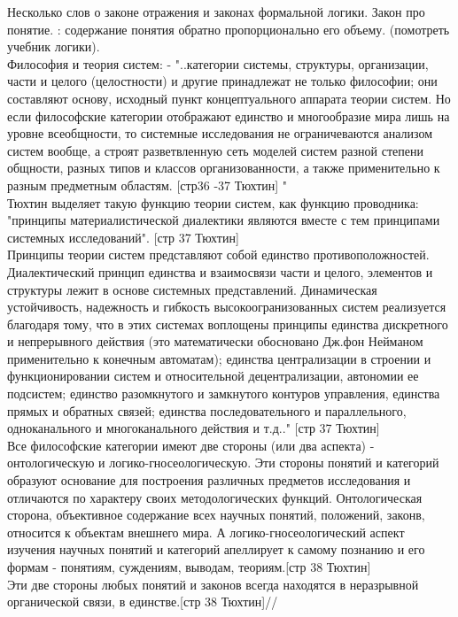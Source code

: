 \documentclass[a4paper,12pt]{report}
\begin{document}
Несколько слов о законе отражения и законах формальной логики.
Закон про понятие. : содержание понятия обратно пропорционально его объему. (помотреть учебник логики).
\\Философия и теория систем: - "..категории системы, структуры, организации, части и целого (целостности) и другие принадлежат не только философии; они составляют основу, исходный пункт концептуального аппарата теории систем. Но если философские категории отображают единство и многообразие мира лишь на уровне всеобщности, то системные исследования не ограничеваются анализом систем вообще, а строят разветвленную сеть моделей систем разной степени общности, разных типов и классов организованности, а также применительно к разным предметным областям. [стр36 -37 Тюхтин] "\\
Тюхтин выделяет такую функцию теории систем, как функцию проводника: "принципы материалистической диалектики являются вместе с тем принципами системных исследований". [стр 37 Тюхтин]\\
Принципы теории систем представляют собой единство противоположностей. Диалектический принцип единства и взаимосвязи части и целого, элементов и структуры лежит в основе системных представлений. Динамическая устойчивость, надежность и гибкость высокоогранизованных систем реализуется благодаря тому, что в этих системах воплощены принципы единства дискретного и непрерывного действия (это математически обосновано Дж.фон Нейманом применительно к конечным автоматам); единства централизации в строении и функционировании систем и относительной децентрализации, автономии ее подсистем; единство разомкнутого и замкнутого контуров управления, единства прямых и обратных связей; единства последовательного и параллельного, одноканального и многоканального действия и т.д.." [стр 37 Тюхтин]\\
Все философские категории имеют две стороны (или два аспекта) - онтологическую и логико-гносеологическую. Эти стороны понятий и категорий образуют основание для построения различных предметов исследования и отличаются по характеру своих методологических функций. Онтологическая сторона, объективное содержание всех научных понятий, положений, законв, относится к объектам внешнего мира. А логико-гносеологический аспект изучения научных понятий и категорий апеллирует к самому познанию и его формам - понятиям, суждениям, выводам, теориям.[стр 38 Тюхтин]\\
Эти две стороны любых понятий и законов всегда находятся в неразрывной органической связи, в единстве.[стр 38 Тюхтин]// 
\end{document}

